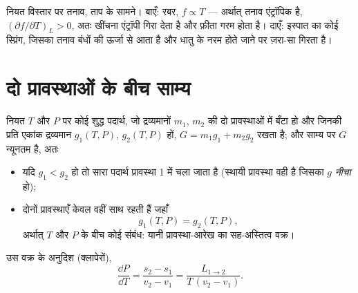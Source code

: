 \begin{omfigure}

{\small नियत विस्तार पर तनाव, ताप के सामने। बाएँ: रबर,
$f \propto T$ --- अर्थात् तनाव एंट्रॉपिक है, $(\partial f/\partial T)_L > 0$,
अतः खींचना एंट्रॉपी गिरा देता है और फ़ीता गरम होता है। दाएँ: इस्पात का कोई
स्प्रिंग, जिसका तनाव बंधों की ऊर्जा से आता है और धातु के नरम होते जाने पर
ज़रा-सा गिरता है।}
\end{omfigure}

\section{दो प्रावस्थाओं के बीच साम्य}

\begin{theorem}[सह-अस्तित्व की शर्त]\label{thm:b2:thermodynamic-potentials:coexistence}
नियत $T$ और $P$ पर कोई शुद्ध पदार्थ, जो द्रव्यमानों $m_1$, $m_2$ की दो
प्रावस्थाओं में बँटा हो और जिनकी प्रति एकांक द्रव्यमान  $g_1(T,P)$,
$g_2(T,P)$ हों, $G = m_1g_1 + m_2g_2$ रखता है; और साम्य पर $G$ न्यूनतम है, अतः
\begin{itemize}
\item यदि $g_1 < g_2$ हो तो सारा पदार्थ प्रावस्था 1 में चला जाता है (स्थायी
      प्रावस्था वही है जिसका $g$ \emph{नीचा} हो);
\item दोनों प्रावस्थाएँ केवल वहीं साथ रहती हैं जहाँ
      \[
      g_1(T,P) = g_2(T,P) ,
      \]
      अर्थात् $T$ और $P$ के बीच कोई संबंध: यानी प्रावस्था-आरेख का
      सह-अस्तित्व वक्र।
\end{itemize}
उस वक्र के अनुदिश (क्लापेरों),
\[
\frac{\dd P}{\dd T} = \frac{s_2 - s_1}{v_2 - v_1} = \frac{L_{1\to2}}{T\,(v_2 - v_1)} .
\]
\end{theorem}

